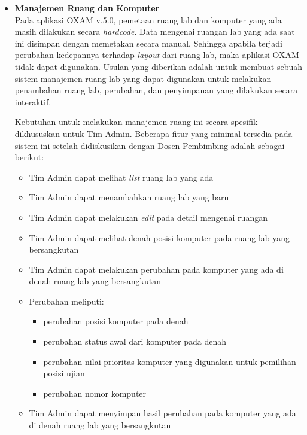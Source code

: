 \documentclass[a4paper,twoside]{article}
\begin{document}
\begin{enumerate}
\begin{itemize}
\begin{itemize}
            		\vspace{0.3cm}
            		
            		\item \textbf{Manajemen Ruang dan Komputer}\\
            		\label{manajemen-ruang}
            		\setlength\parindent{0pt}
            		Pada aplikasi OXAM v.5.0, pemetaan ruang lab dan komputer yang ada masih dilakukan secara \textit{hardcode}. Data mengenai ruangan lab yang ada saat ini disimpan dengan memetakan secara manual. Sehingga apabila terjadi perubahan kedepannya terhadap \textit{layout} dari ruang lab, maka aplikasi OXAM tidak dapat digunakan. Usulan yang diberikan adalah untuk membuat sebuah sistem manajemen ruang lab yang dapat digunakan untuk melakukan penambahan ruang lab, perubahan, dan penyimpanan yang dilakukan secara interaktif.
		
		            \setlength\parindent{24pt}
            		Kebutuhan untuk melakukan manajemen ruang ini secara spesifik dikhususkan untuk Tim Admin. Beberapa fitur yang minimal tersedia pada sistem ini setelah didiskusikan dengan Dosen Pembimbing adalah sebagai berikut:
            		\begin{itemize}
            		    \item Tim Admin dapat melihat \textit{list} ruang lab yang ada
            		    \item Tim Admin dapat menambahkan ruang lab yang baru
            		    \item Tim Admin dapat melakukan \textit{edit} pada detail mengenai ruangan
            		    \item Tim Admin dapat melihat denah posisi komputer pada ruang lab yang bersangkutan
            		    \item Tim Admin dapat melakukan perubahan pada komputer yang ada di denah ruang lab yang bersangkutan
            		    \item Perubahan meliputi:
            		    \begin{itemize}
            		        \item perubahan posisi komputer pada denah
            		        \item perubahan status awal dari komputer pada denah
            		        \item perubahan nilai prioritas komputer yang digunakan untuk pemilihan posisi ujian
            		        \item perubahan nomor komputer
            		    \end{itemize}
                        \item Tim Admin dapat menyimpan hasil perubahan pada komputer yang ada di denah ruang lab yang bersangkutan
            		\end{itemize}
            		

\end{itemize}
\end{itemize}
\end{enumerate}
\end{document}
